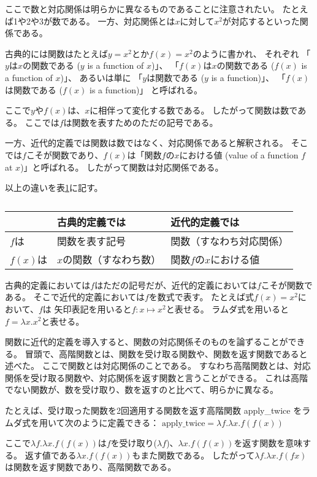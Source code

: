 \documentclass[11pt,a4paper]{ltjsarticle}
\begin{document}
ここで数と対応関係は明らかに異なるものであることに注意されたい。
たとえば1や2や3が数である。
一方、対応関係とは$x$に対して$x^2$が対応するといった関係である。

古典的には関数はたとえば$y = x^2$とか$f(x) = x^2$のように書かれ、
それぞれ
「$y$は$x$の関数である ($y$ is a function of $x$)」、
「$f(x)$は$x$の関数である ($f(x)$ is a function of $x$)」、
あるいは単に
「$y$は関数である ($y$ is a function)」、
「$f(x)$は関数である ($f(x)$ is a function)」
と呼ばれる。

ここで$y$や$f(x)$は、$x$に相伴って変化する数である。
したがって関数は数である。
ここでは$f$は関数を表すためのただの記号である。

一方、近代的定義では関数は数ではなく、対応関係であると解釈される。
そこでは$f$こそが関数であり、$f(x)$は「関数$f$の$x$における値 (value of a function $f$ at $x$)」と呼ばれる。
したがって関数は対応関係である。

以上の違いを表\ref{table2}に記す。

\begin{table}[h]
  \caption{}
  \label{table2}
  \centering
  \begin{tabular}{l|ll}
             & 古典的定義では         & 近代的定義では   \\
    \hline
    $f$は    & 関数を表す記号         & 関数（すなわち対応関係） \\
    $f(x)$は & $x$の関数（すなわち数）& 関数$f$の$x$における値 \\
  \end{tabular}
\end{table}


古典的定義においては$f$はただの記号だが、近代的定義においては$f$こそが関数である。
そこで近代的定義においては$f$を数式で表す。
たとえば式$f(x) = x^2$において、$f$は
矢印表記を用いると$f: x \mapsto x^2$と表せる。
ラムダ式を用いると$f = λx.x^2$と表せる。

関数に近代的定義を導入すると、関数の対応関係そのものを論ずることができる。
冒頭で、高階関数とは、関数を受け取る関数や、関数を返す関数であると述べた。
ここで関数とは対応関係のことである。
すなわち高階関数とは、対応関係を受け取る関数や、対応関係を返す関数と言うことができる。
これは高階でない関数が、数を受け取り、数を返すのと比べて、明らかに異なる。

たとえば、受け取った関数を2回適用する関数を返す高階関数 apply\_twice をラムダ式を用いて次のように定義できる：
$\mathrm{apply\_twice} = λf.λx.f(f(x))$

ここで$λf.λx.f(f(x))$は$f$を受け取り($λf$)、$λx.f(f(x))$を返す関数を意味する。
返す値である$λx.f(f(x))$もまた関数である。
したがって$λf.λx.f(f x)$は関数を返す関数であり、高階関数である。



\nocite{*}


\end{document}
